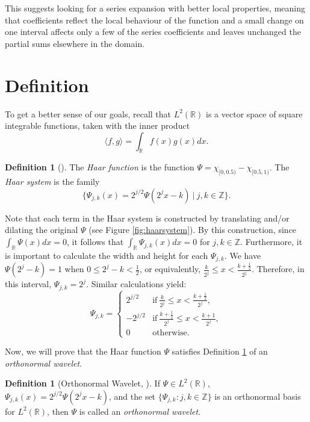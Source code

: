 \documentclass[11pt]{amsart}
\theoremstyle{theorem} %
\theoremstyle{definition}
\newtheorem{defn}[thm]{Definition}
\theoremstyle{example}
\theoremstyle{remark}
\numberwithin{equation}{section}
\newcommand{\R}{\mathbb{R}}
\newcommand{\Z}{\mathbb{Z}}
\begin{document}
This suggests looking for a series expansion with better local properties, meaning that coefficients reflect the local behaviour of the function and a small change
on one interval affects only a few of the series coefficients and leaves unchanged
the partial sums elsewhere in the domain. 

\section{Definition}
To get a better sense of our goals, recall that \emph{$ L^2(\R) $} is a vector space of square integrable functions, taken with the inner product
\[ \langle f,g \rangle = \int_{\R} f(x) g(x)  dx. \]

\begin{defn}[{\cite[515]{davidson}}] \label{haar}
	The \emph{Haar function} is the function $ \varPsi = \chi_{[0,0.5)} - \chi_{[0.5,1)} $. The \emph{Haar system} is the family
	\[ \{ \varPsi_{j,k}(x) = 2^{j/2} \varPsi (2^j x-k) \ | \ j,k \in \Z \}. \]
\end{defn}

	Note that each term in the Haar system is constructed by translating and/or dilating the original $ \varPsi $ (see Figure \ref{fig:haarsystem}). By this construction, since $ \int_{\R} \varPsi(x)dx = 0 $, it follows that $ \int_{\R} \varPsi_{j,k}(x)dx = 0 $ for $ j,k \in \Z $.
	Furthermore, it is important to calculate the width and height for each $ \varPsi_{j,k} $. We have $ \varPsi(2^j - k) = 1 $ when $ 0 \leq 2^j - k < \frac{1}{2} $, or equivalently, $ \frac{k}{2^j} \leq x < \frac{k+\frac{1}{2}}{2^j} $. Therefore, in this interval, $ \varPsi_{j,k} = 2^j $. Similar calculations yield:
	\begin{equation} \label{eq:height}
		\varPsi_{j,k} = 
		\begin{cases}
		2^{j/2} &\text{if}\ \frac{k}{2^j} \leq x < \frac{k+\frac{1}{2}}{2^j}, \\
		-2^{j/2} &\text{if}\ \frac{k+\frac{1}{2}}{2^j} \leq x < \frac{k+1}{2^j}, \\
		0 &\text{otherwise}.
		\end{cases}
	\end{equation}
	
Now, we will prove that the Haar function $ \varPsi $ satisfies Definition \ref{def:wavelet} of an \emph{orthonormal wavelet}.

\begin{defn}[Orthonormal Wavelet, {\cite[303]{pinsky}}] \label{def:wavelet}
	If $ \varPsi \in L^2(\R) $, $ \varPsi_{j,k}(x) = 2^{j/2} \varPsi (2^j x-k) $, and the set $ \{ \varPsi_{j,k}: j,k \in \Z \} $ is an orthonormal basis for $ L^2(\R) $, then $ \varPsi $ is called an \emph{orthonormal wavelet}.
\end{defn}
\end{document}
